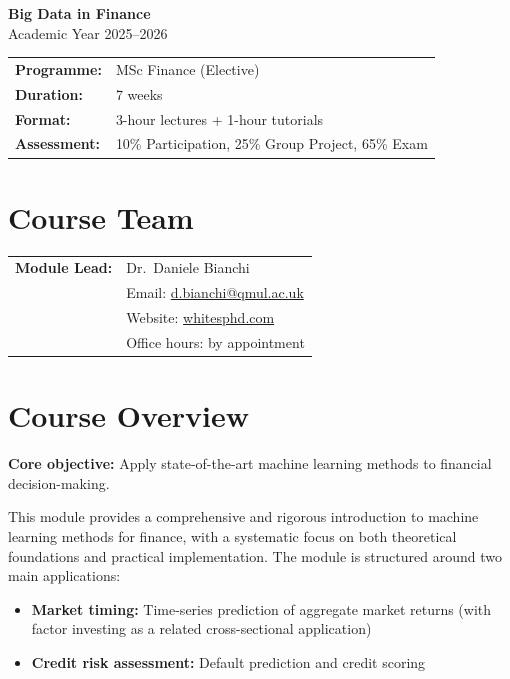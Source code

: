 \documentclass[11pt,a4paper]{article}
\newcommand{\coursetitle}[1]{\textbf{\LARGE\color{ThemeBlue}#1}}
\newcommand{\highlight}[1]{\textcolor{AccentOrange}{\textbf{#1}}}
\begin{document}
\begin{center}
    \coursetitle{Big Data in Finance}\\[0.5em]
    \normalsize Academic Year 2025--2026\\[1em]
    
    \begin{tabular}{ll}
        \toprule
        \textbf{Programme:} & MSc Finance (Elective) \\
        \textbf{Duration:} & 7 weeks \\
        \textbf{Format:} & 3-hour lectures + 1-hour tutorials \\
        \textbf{Assessment:} & 10\% Participation, 25\% Group Project, 65\% Exam \\
        \bottomrule
    \end{tabular}
\end{center}

\vspace{1em}

\section*{Course Team}

\begin{tabular}{@{}ll}
\textbf{Module Lead:} & Dr.\ Daniele Bianchi \\
& Email: \href{mailto:d.bianchi@qmul.ac.uk}{d.bianchi@qmul.ac.uk} \\
& Website: \url{whitesphd.com} \\
& Office hours: by appointment \\
\end{tabular}

\section{Course Overview}

\textbf{Core objective:} Apply state-of-the-art machine learning methods to financial decision-making.

This module provides a comprehensive and rigorous introduction to machine learning methods for finance, with a systematic focus on both theoretical foundations and practical implementation. The module is structured around two main applications:

\begin{itemize}[leftmargin=*]
    \item \highlight{Market timing:} Time-series prediction of aggregate market returns (with factor investing as a related cross-sectional application)
    \item \highlight{Credit risk assessment:} Default prediction and credit scoring
\end{itemize}
\end{document}
